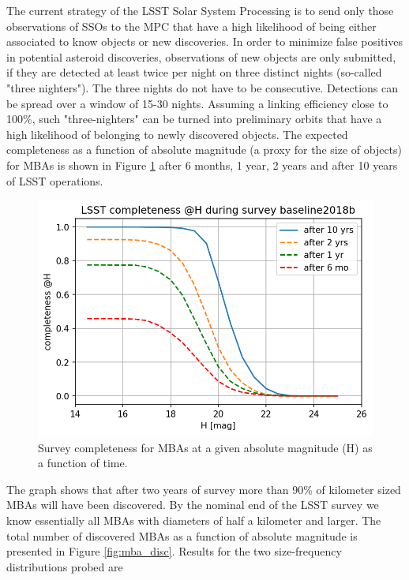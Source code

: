 The current strategy of the \gls{LSST} Solar System Processing is to send only those observations of SSOs to the \gls{MPC} that have a high likelihood of being either associated to know objects or new discoveries.
In order to minimize false positives in potential asteroid discoveries, observations of new objects are only submitted, if they are detected at least twice per night on three distinct nights (so-called "three nighters"). The three nights do not have to be consecutive. Detections can be spread over a window of 15-30 nights. Assuming a linking efficiency close to 100\%, such "three-nighters" can be turned into preliminary orbits that have a high likelihood of belonging to newly discovered objects.
The expected completeness as a function of absolute magnitude (a proxy for the size of objects) for MBAs is shown in Figure \ref{fig:mba_compl} after 6 months, 1 year, 2 years and after 10 years of \gls{LSST} operations.
\begin{figure}[b!]
\begin{center}
\includegraphics[scale=0.7]{figs/mba_completeness3.png}
\end{center}
\caption{Survey completeness for MBAs at a given absolute magnitude (H) as a function of time.}
\label{fig:mba_compl}       %
\end{figure}
%
The graph shows that after two years of survey more than 90\% of kilometer sized MBAs will have been discovered.
By the nominal end of the \gls{LSST} survey we know essentially all MBAs with diameters of half a kilometer and larger.
The total number of discovered MBAs as a function of absolute magnitude is presented in Figure \ref{fig:mba_disc}. Results for the two  size-frequency distributions probed are
